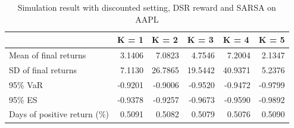 \documentclass{article}
\begin{document}
\begin{table}[H]
\centering
\begin{tabular}{|l|r|r|r|r|r|} 
\hline
                             & \multicolumn{1}{l|}{K = 1} & \multicolumn{1}{l|}{K = 2} & \multicolumn{1}{l|}{K = 3} & \multicolumn{1}{l|}{K = 4} & \multicolumn{1}{l|}{K = 5}  \\ 
\hline
Mean of final returns        & 3.1406                     & 7.0823                     & 4.7546                     & 7.2004                     & 2.1347                      \\ 
\hline
SD of final returns          & 7.1130                     & 26.7865                    & 19.5442                    & 40.9371                    & 5.2376                      \\ 
\hline
95\% VaR                     & -0.9201                    & -0.9006                    & -0.9520                    & -0.9472                    & -0.9799                     \\ 
\hline
95\% ES                      & -0.9378                    & -0.9257                    & -0.9673                    & -0.9590                    & -0.9892                     \\ 
\hline
Days of positive return (\%) & 0.5091                     & 0.5082                     & 0.5079                     & 0.5076                     & 0.5090                      \\
\hline
\end{tabular}
\caption{Simulation result with discounted setting, DSR reward and SARSA on AAPL}
\label{table5}
\end{table}
\end{document}
